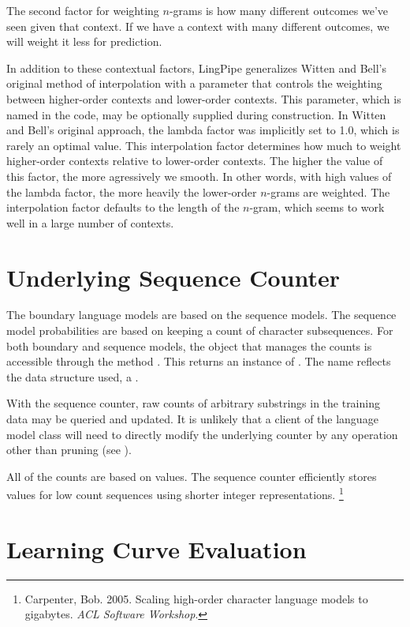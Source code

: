 The second factor for weighting $n$-grams is how many different
outcomes we've seen given that context.  If we have a context with
many different outcomes, we will weight it less for prediction. 

In addition to these contextual factors, LingPipe generalizes Witten
and Bell's original method of interpolation with a parameter that
controls the weighting between higher-order contexts and lower-order
contexts.  This parameter, which is named  in the
code, may be optionally supplied during construction.  In Witten and
Bell's original approach, the lambda factor was implicitly set to 1.0,
which is rarely an optimal value.  This interpolation factor
determines how much to weight higher-order contexts relative to
lower-order contexts.  The higher the value of this factor, the more
agressively we smooth.  In other words, with high values of the lambda
factor, the more heavily the lower-order $n$-grams are weighted.  The
interpolation factor defaults to the length of the $n$-gram, which
seems to work well in a large number of contexts.

\section{Underlying Sequence Counter}

The boundary language models are based on the sequence models.  The
sequence model probabilities are based on keeping a count of character
subsequences.  For both boundary and sequence models, the object that
manages the counts is accessible through the method
.  This returns an instance of
.  The name reflects the data structure used,
a .  

With the sequence counter, raw counts of arbitrary substrings in
the training data may be queried and updated.  It is unlikely that
a client of the language model class will need to directly modify
the underlying counter by any operation other than pruning (see
).  

All of the counts are based on  values.  The sequence
counter efficiently stores values for low count sequences using
shorter integer representations.%
%
\footnote{Carpenter, Bob.  2005.  Scaling high-order character
language models to gigabytes. {\it ACL Software Workshop}.}


\section{Learning Curve Evaluation}

